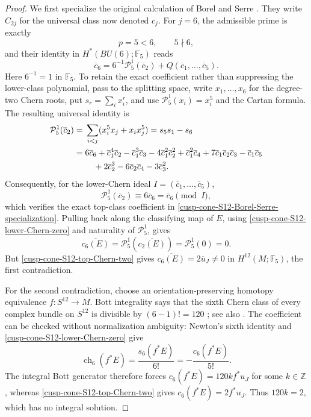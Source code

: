 \begin{proof}
We first specialize the original calculation of Borel and Serre
\cite[\S12, Proposition~12.4, Lemma~12.5, and Proposition~12.6,
p.~430; \S15, Proposition~15.1, p.~434]{BorelSerre1953}.
They write \(C_{2j}\) for the universal class now denoted \(c_j\).
For \(j=6\), the admissible prime is exactly
\[
 p=5<6,\qquad 5\nmid6,
\]
and their identity in \(H^*(BU(6);\mathbb F_5)\) reads
\begin{equation}
 \overline c_6
 =6^{-1}\mathcal P_5^1(\overline c_2)
   +Q(\overline c_1,\ldots,\overline c_5).
 \label{cusp-cone-S12-Borel-Serre-specialization}
\end{equation}
Here \(6^{-1}=1\) in \(\mathbb F_5\).  To retain the exact coefficient rather
than suppressing the lower-class polynomial, pass to the splitting space,
write \(x_1,\ldots,x_6\) for the degree-two Chern roots, put
\(s_r=\sum_i x_i^r\), and use
\(\mathcal P_5^1(x_i)=x_i^5\) and the Cartan formula.  The resulting universal
identity is
\begin{align}
 \mathcal P_5^1(\overline c_2)
 ={}&\sum_{i<j}(x_i^5x_j+x_ix_j^5)=s_5s_1-s_6 \notag\\
 ={}&6\overline c_6+\overline c_1^4\overline c_2
 -\overline c_1^3\overline c_3
 -4\overline c_1^2\overline c_2^2
 +\overline c_1^2\overline c_4
 +7\overline c_1\overline c_2\overline c_3
 -\overline c_1\overline c_5 \notag\\
 &\quad+2\overline c_2^3-6\overline c_2\overline c_4
 -3\overline c_3^2.
 \label{cusp-cone-S12-P1-exact}
\end{align}
Consequently, for the lower-Chern ideal
\(I=(\overline c_1,\ldots,\overline c_5)\),
\begin{equation}
 \mathcal P_5^1(\overline c_2)
 \equiv6\overline c_6=\overline c_6\pmod I,
 \label{cusp-cone-S12-P1-lower-ideal}
\end{equation}
which verifies the exact top-class coefficient in
\cref{cusp-cone-S12-Borel-Serre-specialization}.  Pulling back along the
classifying map of \(E\), using \cref{cusp-cone-S12-lower-Chern-zero} and
naturality of \(\mathcal P_5^1\), gives
\[
 \overline{c_6(E)}=\mathcal P_5^1(\overline{c_2(E)})
 =\mathcal P_5^1(0)=0.
\]
But \cref{cusp-cone-S12-top-Chern-two} gives
\(\overline{c_6(E)}=2\overline u_J\ne0\) in
\(H^{12}(M;\mathbb F_5)\), the first contradiction.

For the second contradiction, choose an orientation-preserving homotopy
equivalence \(f:S^{12}\to M\).  Bott integrality says that the sixth Chern
class of every complex bundle on \(S^{12}\) is divisible by
\((6-1)!=120\)
\cite[Chapter~20, \S9, Theorem~9.6 and Corollary~9.8,
p.~308]{Husemoller1994}; see also
\cite[\S6]{KonstantisParton2018}.  The coefficient can be checked without
normalization ambiguity: Newton's sixth identity and
\cref{cusp-cone-S12-lower-Chern-zero} give
\[
 \operatorname{ch}_6(f^*E)
 =\frac{s_6(f^*E)}{6!}
 =-\frac{c_6(f^*E)}{5!}.
\]
The integral Bott generator therefore forces
\(c_6(f^*E)=120k f^*u_J\) for some \(k\in\mathbb Z\), whereas
\cref{cusp-cone-S12-top-Chern-two} gives
\(c_6(f^*E)=2f^*u_J\).  Thus \(120k=2\), which has no integral solution.


\end{proof}
